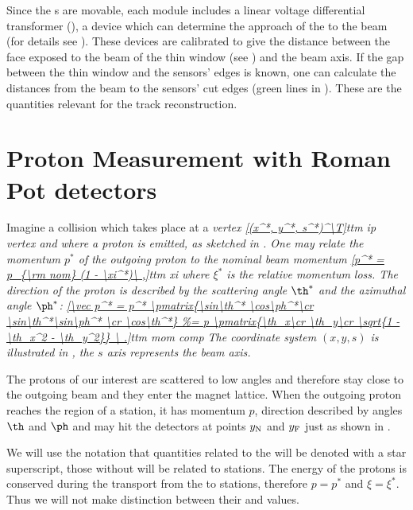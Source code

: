 Since the s are movable, each  module includes a linear voltage differential transformer (), a device which can determine the approach of the  to the beam (for details see ). These devices are calibrated to give the distance between the face exposed to the beam of the thin window (see ) and the beam axis. If the gap between the thin window and the sensors' edges is known, one can calculate the distances from the beam to the sensors' cut edges (green lines in ). These are the quantities relevant for the track reconstruction.




\section[rp measurement]{Proton Measurement with Roman Pot detectors}



Imagine a collision which takes place at a \em{vertex}
\eqref{(x^*, y^*, s^*)^\T}{ttm ip vertex}
and where a proton is emitted, as sketched in . One may relate the momentum $p^*$ of the outgoing proton to the nominal beam momentum
\eqref{p^* = p_{\rm nom} (1 - \xi^*)\ ,}{ttm xi}
where $\xi^*$ is the relative \em{momentum loss}. The direction of the proton is described by the \em{scattering angle} $\th^*$ and the \em{azimuthal angle} $\ph^*$:
\eqref{\vec p^* = p^* \pmatrix{\sin\th^* \cos\ph^*\cr \sin\th^*\sin\ph^* \cr \cos\th^*}
\ .}{ttm mom comp}
The coordinate system $(x, y, s)$ is illustrated in , the $s$ axis represents the beam axis.

The protons of our interest are scattered to low angles and therefore stay close to the outgoing beam and they enter the  magnet lattice. When the outgoing proton reaches the region of a  station, it has momentum $p$, direction described by angles $\th$ and $\ph$ and may hit the detectors at points $y_{\rm N}$ and $y_{\rm F}$ just as shown in .

We will use the notation that quantities related to the  will be denoted with a star superscript, those without will be related to  stations. The energy of the protons is conserved during the  transport from the  to  stations, therefore $p = p^*$ and $\xi = \xi^*$. Thus we will not make distinction between their  and  values.

